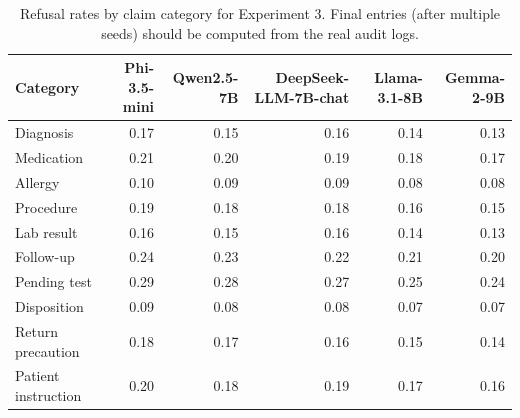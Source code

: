 \begin{table}[t]
\centering
\small
\begin{tabular}{lrrrrr}
\toprule
Category & Phi-3.5-mini & Qwen2.5-7B & DeepSeek-LLM-7B-chat & Llama-3.1-8B & Gemma-2-9B \\
\midrule
Diagnosis & 0.17 & 0.15 & 0.16 & 0.14 & 0.13 \\
Medication & 0.21 & 0.20 & 0.19 & 0.18 & 0.17 \\
Allergy & 0.10 & 0.09 & 0.09 & 0.08 & 0.08 \\
Procedure & 0.19 & 0.18 & 0.18 & 0.16 & 0.15 \\
Lab result & 0.16 & 0.15 & 0.16 & 0.14 & 0.13 \\
Follow-up & 0.24 & 0.23 & 0.22 & 0.21 & 0.20 \\
Pending test & 0.29 & 0.28 & 0.27 & 0.25 & 0.24 \\
Disposition & 0.09 & 0.08 & 0.08 & 0.07 & 0.07 \\
Return precaution & 0.18 & 0.17 & 0.16 & 0.15 & 0.14 \\
Patient instruction & 0.20 & 0.18 & 0.19 & 0.17 & 0.16 \\
\bottomrule
\end{tabular}
\caption{Refusal rates by claim category for Experiment 3. Final entries (after multiple seeds) should be computed from the real audit logs.}
\label{tab:exp3_placeholder}
\end{table}